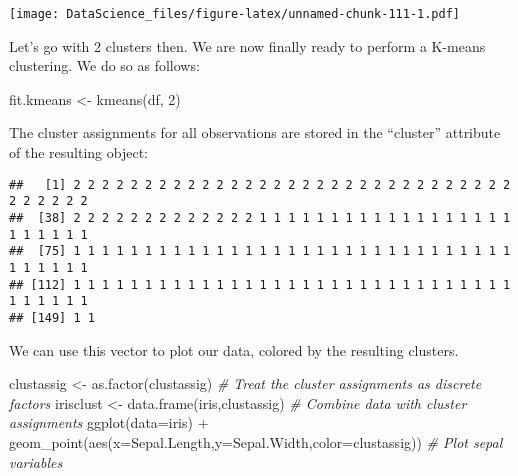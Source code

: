 \documentclass[
]{book}
\newenvironment{Shaded}{\begin{snugshade}}{\end{snugshade}}
\newcommand{\AttributeTok}[1]{\textcolor[rgb]{0.77,0.63,0.00}{#1}}
\newcommand{\CommentTok}[1]{\textcolor[rgb]{0.56,0.35,0.01}{\textit{#1}}}
\newcommand{\DecValTok}[1]{\textcolor[rgb]{0.00,0.00,0.81}{#1}}
\newcommand{\FunctionTok}[1]{\textcolor[rgb]{0.00,0.00,0.00}{#1}}
\newcommand{\NormalTok}[1]{#1}
\newcommand{\OtherTok}[1]{\textcolor[rgb]{0.56,0.35,0.01}{#1}}
\newcommand{\SpecialCharTok}[1]{\textcolor[rgb]{0.00,0.00,0.00}{#1}}
\begin{document}
\texttt{[image: DataScience\_files/figure-latex/unnamed-chunk-111-1.pdf]}

Let's go with 2 clusters then. We are now finally ready to perform a K-means clustering. We do so as follows:

\begin{Shaded}
\begin{Highlighting}[]
\NormalTok{fit.kmeans }\OtherTok{\textless{}{-}} \FunctionTok{kmeans}\NormalTok{(df, }\DecValTok{2}\NormalTok{)}
\end{Highlighting}
\end{Shaded}

The cluster assignments for all observations are stored in the ``cluster'' attribute of the resulting object:

\begin{Shaded}
\end{Shaded}

\begin{verbatim}
##   [1] 2 2 2 2 2 2 2 2 2 2 2 2 2 2 2 2 2 2 2 2 2 2 2 2 2 2 2 2 2 2 2 2 2 2 2 2 2
##  [38] 2 2 2 2 2 2 2 2 2 2 2 2 2 1 1 1 1 1 1 1 1 1 1 1 1 1 1 1 1 1 1 1 1 1 1 1 1
##  [75] 1 1 1 1 1 1 1 1 1 1 1 1 1 1 1 1 1 1 1 1 1 1 1 1 1 1 1 1 1 1 1 1 1 1 1 1 1
## [112] 1 1 1 1 1 1 1 1 1 1 1 1 1 1 1 1 1 1 1 1 1 1 1 1 1 1 1 1 1 1 1 1 1 1 1 1 1
## [149] 1 1
\end{verbatim}

We can use this vector to plot our data, colored by the resulting clusters.

\begin{Shaded}
\begin{Highlighting}[]
\NormalTok{clustassig }\OtherTok{\textless{}{-}} \FunctionTok{as.factor}\NormalTok{(clustassig) }\CommentTok{\# Treat the cluster assignments as discrete factors}
\NormalTok{irisclust }\OtherTok{\textless{}{-}} \FunctionTok{data.frame}\NormalTok{(iris,clustassig) }\CommentTok{\# Combine data with cluster assignments}
\FunctionTok{ggplot}\NormalTok{(}\AttributeTok{data=}\NormalTok{iris) }\SpecialCharTok{+} \FunctionTok{geom\_point}\NormalTok{(}\FunctionTok{aes}\NormalTok{(}\AttributeTok{x=}\NormalTok{Sepal.Length,}\AttributeTok{y=}\NormalTok{Sepal.Width,}\AttributeTok{color=}\NormalTok{clustassig)) }\CommentTok{\# Plot sepal variables}
\end{Highlighting}
\end{Shaded}
\end{document}
